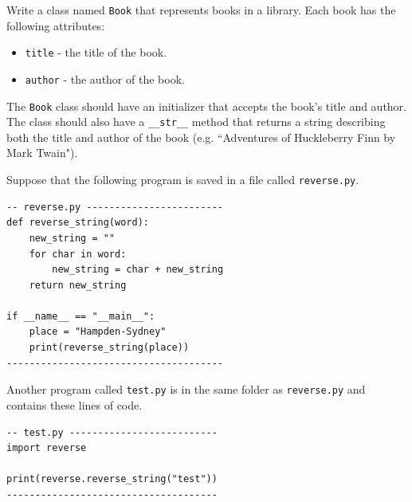 \documentclass[12pt]{exam}
\begin{document}
\begin{questions}

\question[10] Write a class named \verb|Book| that represents books in a library. Each book has the following
attributes:
\begin{itemize}
\item \verb|title| - the title of the book.
\item \verb|author| - the author of the book.
\end{itemize}
The \verb|Book| class should have an initializer that accepts the book’s title and author.
The class should also have a \verb|__str__| method that returns a string describing both the title and author of the book (e.g. ``Adventures of Huckleberry Finn by Mark Twain").
\vfill
\vfill
\vfill
\vfill


\newpage
\question[8] Suppose that the following program is saved in a file called \verb|reverse.py|. %
\begin{verbatim}
-- reverse.py ------------------------
def reverse_string(word):
    new_string = ""
    for char in word:
        new_string = char + new_string
    return new_string

if __name__ == "__main__":
    place = "Hampden-Sydney"
    print(reverse_string(place))
--------------------------------------
\end{verbatim}
Another program called \verb|test.py| is in the same folder as \verb|reverse.py| and contains these lines of code.
\begin{verbatim}
-- test.py --------------------------
import reverse

print(reverse.reverse_string("test"))
-------------------------------------
\end{verbatim}

\begin{parts}

\end{parts}
\end{questions}
\end{document}
